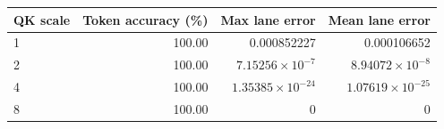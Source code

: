 \begin{center}\small
\begin{tabular}{@{}lrrr@{}}
\toprule
QK scale & Token accuracy (\%) & Max lane error & Mean lane error \\
\midrule
1 & 100.00 & 0.000852227 & 0.000106652 \\
2 & 100.00 & $7.15256\times 10^{-7}$ & $8.94072\times 10^{-8}$ \\
4 & 100.00 & $1.35385\times 10^{-24}$ & $1.07619\times 10^{-25}$ \\
8 & 100.00 & 0 & 0 \\
\bottomrule
\end{tabular}
\end{center}
